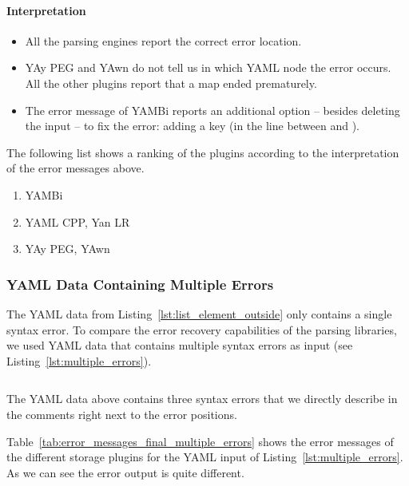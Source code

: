 \paragraph{Interpretation}

\begin{itemize}
  \item All the parsing engines report the correct error location.
  \item YAy PEG and YAwn do not tell us in which YAML node the error occurs. All the other plugins report that a map ended prematurely.
  \item The error message of YAMBi reports an additional option – besides deleting the input – to fix the error: adding a key (in the line between  and ).
\end{itemize}

The following list shows a ranking of the plugins according to the interpretation of the error messages above.

\begin{enumerate}
  \item YAMBi
  \item YAML CPP, Yan LR
  \item YAy PEG, YAwn
\end{enumerate}

\subsubsection{YAML Data Containing Multiple Errors}

The YAML data from Listing~\ref{lst:list_element_outside} only contains a single syntax error. To compare the error recovery capabilities of the parsing libraries, we used YAML data that contains multiple syntax errors as input (see Listing~\ref{lst:multiple_errors}).

\begin{listing}
  \begin{code-boxed}
    \inputminted[linenos]{yaml}{Data/Errors/multiple_errors.yaml}
  \end{code-boxed}
  \caption{The YAML data above contains three syntax errors that we directly describe in the comments right next to the error positions.}
  \label{lst:multiple_errors}
\end{listing}

Table~\ref{tab:error_messages_final_multiple_errors} shows the error messages of the different storage plugins for the YAML input of Listing~\ref{lst:multiple_errors}. As we can see the error output is quite different.

